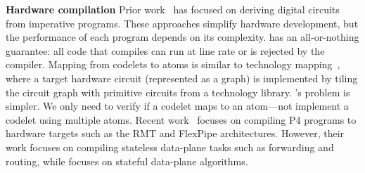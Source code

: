 \textbf{Hardware compilation}
Prior work~\cite{nurvadathi, cash, bluespec} has focused on deriving digital
circuits from imperative programs. These approaches simplify hardware
development, but the performance of each program depends on its complexity.
\pktlanguage has an all-or-nothing guarantee: all code that compiles can run at
line rate or is rejected by the compiler.  Mapping from codelets to atoms is
similar to technology mapping~\cite{micheli, flowmap, spectransform}, where a
target hardware circuit (represented as a graph) is implemented by tiling the
circuit graph with primitive circuits from a technology library. \pktlanguage's
problem is simpler. We only need to verify if a codelet maps to an atom---not
implement a codelet using multiple atoms.  Recent work~\cite{lavanya_compiler}
focuses on compiling P4 programs to hardware targets such as the RMT and
FlexPipe architectures. However, their work focuses on compiling stateless
data-plane tasks such as forwarding and routing, while \pktlanguage focuses on
stateful data-plane algorithms.

